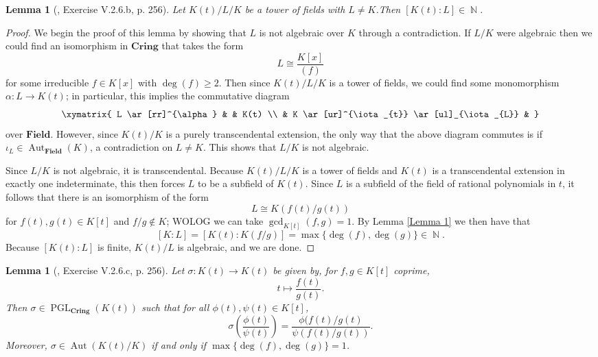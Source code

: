 \documentclass[10pt]{article}
\newtheorem{Lemma}[Theorem]{Lemma}
\DeclareMathOperator{\N}{\mathbb{N}}
\DeclareMathOperator{\aut}{Aut}
\DeclareMathOperator{\End}{PGL}
\DeclareMathOperator{\End}{End}
\DeclareMathOperator{\aut}{rank}
\numberwithin{Theorem}{section}
\begin{document}
\begin{Lemma}[\cite{Hungerford}, Exercise V.2.6.b, p. 256] 
Let $K(t)/L/K$ be a tower of fields with $L \ne K$.Then $[K(t):L] \in \N$.
\end{Lemma}
\begin{proof}
We begin the proof of this lemma by showing that $L$ is not algebraic over $K$ through a contradiction. If $L/K$ were algebraic then we could find an isomorphism in $\mathbf{Cring}$ that takes the form
$$ L \cong \frac{K[x]}{(f)} $$
for some irreducible $f \in K[x]$ with $\deg(f) \geq 2$. Then since $K(t)/L/K$ is a tower of fields, we could find some monomorphism $\alpha:L \to K(t)$; in particular, this implies the commutative diagram
\begin{displaymath}
\xymatrix{
L \ar[rr]^{\alpha} & & K(t) \\
 & K \ar[ur]^{\iota_{t}} \ar[ul]_{\iota_{L}} &
}
\end{displaymath}
over $\mathbf{Field}$. However, since $K(t)/K$ is a purely transcendental extension, the only way that the above diagram commutes is if $\iota_L \in \aut_{\mathbf{Field}}(K)$, a contradiction on $L \ne K$. This shows that $L/K$ is not algebraic.

Since $L/K$ is not algebraic, it is transcendental. Because $K(t)/L/K$ is a tower of fields and $K(t)$ is a transcendental extension in exactly one indeterminate, this then forces $L$ to be a subfield of $K(t)$. Since $L$ is a subfield of the field of rational polynomials in $t$, it follows that there is an isomorphism of the form
$$ L \cong K(f(t)/g(t))$$
for $f(t), g(t) \in K[t]$ and $f/g \notin K$; WOLOG we can take $\gcd_{K[t]}(f,g) = 1$. By Lemma \ref{Lemma 1} we then have that $$[K:L] = [K(t):K(f/g)]=\max\lbrace \deg(f), \deg(g) \rbrace \in \N.$$
Because $[K(t):L]$ is finite, $K(t)/L$ is algebraic, and we are done.
\end{proof}
\begin{Lemma}[\cite{Hungerford}, Exercise V.2.6.c, p. 256] 
Let $\sigma:K(t) \to K(t)$ be given by, for $f,g \in K[t]$ coprime,
$$ t \mapsto \frac{f(t)}{g(t)}.$$
Then $\sigma \in \End_{\mathbf{Cring}}(K(t))$ such that for all $\phi(t), \psi(t) \in K[t]$,
$$ \sigma\left(\frac{\phi(t)}{\psi(t)}\right) = \frac{\phi(f(t)/g(t)}{\psi(f(t)/g(t))}.$$
Moreover, $\sigma \in \aut(K(t)/K)$ if and only if $\max\lbrace\deg(f),\deg(g)\rbrace = 1$.
\end{Lemma}
\end{document}
